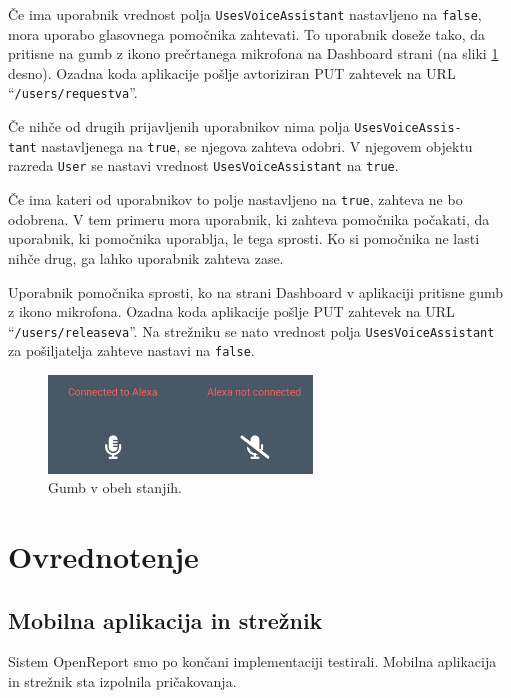\documentclass[a4paper, 12pt]{book}
\begin{document}
Če ima uporabnik vrednost polja \texttt{UsesVoiceAssistant} nastavljeno na \texttt{false}, mora uporabo glasovnega pomočnika zahtevati.
To uporabnik doseže tako, da pritisne na gumb z ikono prečrtanega mikrofona na Dashboard strani (na sliki \ref{app_alexa_yesno} desno).
Ozadna koda aplikacije pošlje avtoriziran PUT zahtevek na URL \enquote{\texttt{/users/requestva}}.

Če nihče od drugih prijavljenih uporabnikov nima polja \texttt{UsesVoiceAssis-\\tant} nastavljenega na \texttt{true}, se njegova zahteva odobri.
V njegovem objektu razreda \texttt{User} se nastavi vrednost \texttt{UsesVoiceAssistant} na \texttt{true}.

Če ima kateri od uporabnikov to polje nastavljeno na \texttt{true}, zahteva ne bo odobrena.
V tem primeru mora uporabnik, ki zahteva pomočnika počakati, da uporabnik, ki pomočnika uporablja, le tega sprosti.
Ko si pomočnika ne lasti nihče drug, ga lahko uporabnik zahteva zase.

Uporabnik pomočnika sprosti, ko na strani Dashboard v aplikaciji pritisne gumb z ikono mikrofona.
Ozadna koda aplikacije pošlje PUT zahtevek na URL \enquote{\texttt{/users/releaseva}}.
Na strežniku se nato vrednost polja \texttt{UsesVoiceAssistant} za pošiljatelja zahteve nastavi na \texttt{false}.


\begin{figure}[H]
\begin{center}
\includegraphics[width=7cm]{app_alexa_yesno}
\end{center}
	\caption{Gumb v obeh stanjih.}
\label{app_alexa_yesno}
\end{figure}




\chapter{Ovrednotenje}

\section{Mobilna aplikacija in strežnik}

Sistem OpenReport smo po končani implementaciji testirali. 
Mobilna aplikacija in strežnik sta izpolnila pričakovanja.
\end{document}
